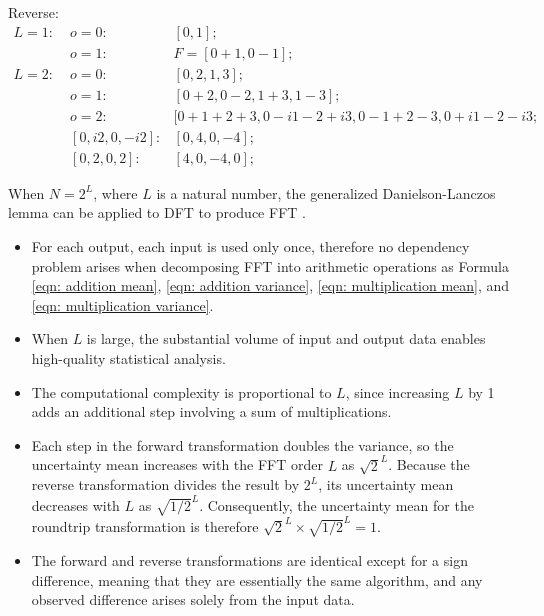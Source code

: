 \documentclass[twoside]{article}
\numberwithin{equation}{section}
\begin{document}
Reverse:
\begin{align*}
L = 1:\;& o=0: & [0, 1]; \\
 & o = 1: & F = [0 + 1, 0 - 1]; \\
L = 2:\;& o=0: & [0, 2, 1, 3]; \\
 & o = 1: & [0 + 2, 0 - 2, 1 + 3, 1 - 3]; \\
 & o = 2: & [0 + 1 + 2 + 3, 0 - i 1 - 2 + i 3 , 0 - 1 + 2 - 3, 0 + i 1 - 2 - i 3; \\
 & [0, i 2, 0, - i 2]:& [0, 4, 0, -4]; \\
 & [0, 2, 0, 2]:& [4, 0, -4, 0];
\end{align*}

\fi


When $N = 2^{L}$, where $L$ is a natural number, the generalized Danielson-Lanczos lemma \cite{Numerical_Recipes} can be applied to DFT to produce  FFT \cite{Numerical_Recipes}. 
\begin{itemize}

\item For each output, each input is used only once, therefore no dependency problem arises when decomposing FFT into arithmetic operations as Formula \eqref{eqn: addition mean}, \eqref{eqn: addition variance}, \eqref{eqn: multiplication mean}, and \eqref{eqn: multiplication variance}.

\item When $L$ is large, the substantial volume of input and output data enables high-quality statistical analysis.

\item The computational complexity is proportional to $L$, since increasing $L$ by 1 adds an additional step involving a sum of multiplications.

\item Each step in the forward transformation doubles the variance, so the uncertainty mean increases with the FFT order $L$ as $\sqrt{2}^L$.
Because the reverse transformation divides the result by $2^L$, its uncertainty mean decreases with $L$ as $\sqrt{1/2}^L$.
Consequently, the uncertainty mean for the roundtrip transformation is therefore $\sqrt{2}^L \times \sqrt{1/2}^L = 1$.

\item The forward and reverse transformations are identical except for a sign difference, meaning that they are essentially the same algorithm, and any observed difference arises solely from the input data.  

\end{itemize}
\end{document}
